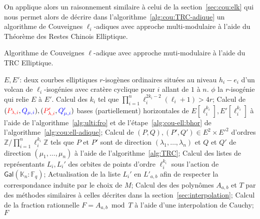 \documentclass[10pt,a4paper]{book}
\theoremstyle{plain}
\theoremstyle{definition}
\theoremstyle{definition}
\theoremstyle{definition}
\theoremstyle{definition}
\theoremstyle{remark}
\theoremstyle{remark}
\theoremstyle{definition}
\begin{document}
On applique alors un raisonnement similaire à celui de la 
section~\ref{sec:cou:elk} qui nous permet alors de décrire dans 
l'algorithme~\ref{alg:cou:TRC-adique} un algorithme de Couveignes 
$\ell_i$-adiques avec approche multi-modulaire à l'aide du Théorème des Restes 
Chinois Elliptique.
 
\begin{algorithm}
\caption{\label{alg:cou:TRC-adique} Algorithme de Couveignes $\ell$-adique avec approche muti-modulaire à l'aide du TRC Elliptique.}
\begin{algorithmic}[1]
\REQUIRE $E,E'$: deux courbes elliptiques $r$-isogènes ordinaires situées au niveau $h_i-e_i$ d'un volcan de $\ell_i$-isogénies avec cratère cyclique pour $i$ allant de $1$ à $n$.
\ENSURE $\phi$ la $r$-isogénie qui relie $E$ à $E'$.
\STATE Calcul des $k_i$ tel que $\prod_{i=1}^n\ell_{i}^{2k_{i}-2}(\ell_{i}+1)>4r$;
\STATE \label{alg:cou:TRC-adique:bhor} Calcul de $(\color{red}P_{\lambda,i}\color{black},\color{blue}Q_{\mu,i}\color{black}),(\color{red}P'_{\lambda,i}\color{black},\color{blue}Q_{\mu,i}'\color{black})$ bases (partiellement) horizontales de $E[\ell_i^{k_i}],E'[\ell_i^{k_i}]$ à l'aide de l'algorithme~\ref{alg:ulti:fro} et de l'étape~\ref{alg:cou-ell:bhor} de l'algorithme~\ref{alg:cou:ell-adique};
\ENDFOR
\STATE \label{alg:cou:TRC-adique:TRC} Calcul de $(P,Q),(P',Q') \in E^2 \times E'^2$ d'ordres $ \mathbb{Z}/\prod_{i=1}^n \ell_i^{k_i}\mathbb{Z}$ tels que $P$ et $P'$ sont de direction $(\lambda_1, \dots, \lambda_n)$ et $Q$ et $Q'$ de direction $(\mu_1, \dots, \mu_n)$ à l'aide de l'algorithme~\ref{alg:TRC};
\STATE \label{alg:cou:TRC-adique:rep} Calcul des listes de représentants $L_i,L_i'$ des orbites de points d'ordre $\ell_i^{k_i}$ sous l'action de $\mathsf{Gal}(\mathbb{K}_n:\mathbb{F}_q)$;
\STATE \label{alg:cou:TRC-adique:ord} Actualisation de la liste $L_i'$ en $L'_{a,b}$ afin de respecter la correspondance induite par le choix de $M$;
\STATE \label{alg:cou:TRC-adique:int} Calcul des des polynômes $A_{a,b}$ et $T$ par des méthodes similaires à celles décrites dans la section~\ref{sec:interpolation};
\STATE \label{alg:cou:TRC-adique:Cauchy} Calcul de la fraction rationnelle $F=A_{a,b} \bmod T$ à l'aide d'une interpolation de Cauchy;
 \label{alg:cou:TRC-adique:test}
\RETURN $F$
\ENDIF
\ENDFOR 
\end{algorithmic}
\end{algorithm}
\end{document}
